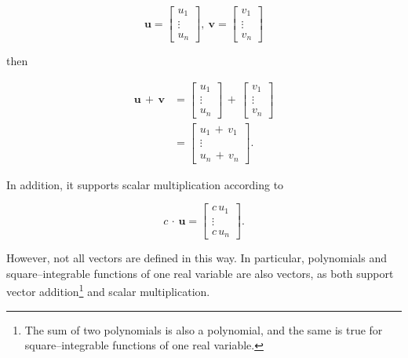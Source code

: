 \documentclass[graybox,envcountchap,sectrefs]{svmono}\usepackage[]{graphicx}\usepackage[]{xcolor}
\begin{document}
\begin{appendices}
\begin{equation}
\mathrm{\mathbf{u}}=\left[\begin{array}{c}
u_{1}\\
\vdots\\
u_{n}
\end{array}\right],\ \mathrm{\mathbf{v}}=\left[\begin{array}{c}
v_{1}\\
\vdots\\
v_{n}
\end{array}\right]\label{eq:Vector1}
\end{equation}

then

\begin{align}
\mathrm{\mathbf{u}}\,+\,\mathrm{\mathbf{v}} & =\left[\begin{array}{c}
u_{1}\\
\vdots\\
u_{n}
\end{array}\right]\,+\,\left[\begin{array}{c}
v_{1}\\
\vdots\\
v_{n}
\end{array}\right]\label{eq:Vector2}\\[0.5em]
 & =\left[\begin{array}{c}
u_{1}\,+\,v_{1}\\
\vdots\\
u_{n}\,+\,v_{n}
\end{array}\right].\label{eq:Vector3}
\end{align}

In addition, it supports scalar multiplication according to

\begin{equation}
c\,\cdot\,\mathrm{\mathbf{u}}=\left[\begin{array}{c}
c\,u_{1}\\
\vdots\\
c\,u_{n}
\end{array}\right].\label{eq:Vector4}
\end{equation}

However, not all vectors are defined in this way. In particular, polynomials
and square--integrable functions of one real variable are also vectors,
as both support vector addition\footnote{The sum of two polynomials is also a polynomial, and the same is true
for square--integrable functions of one real variable.} and scalar multiplication. 


\end{appendices}
\end{document}
